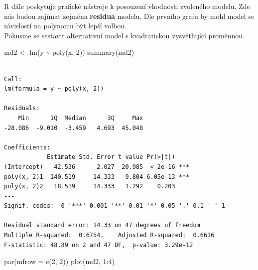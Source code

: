 \documentclass[
  letterpaper,
  DIV=11,
  numbers=noendperiod]{scrreprt}
\newenvironment{Shaded}{\begin{snugshade}}{\end{snugshade}}
\newcommand{\AttributeTok}[1]{\textcolor[rgb]{0.40,0.45,0.13}{#1}}
\newcommand{\DecValTok}[1]{\textcolor[rgb]{0.68,0.00,0.00}{#1}}
\newcommand{\FunctionTok}[1]{\textcolor[rgb]{0.28,0.35,0.67}{#1}}
\newcommand{\NormalTok}[1]{\textcolor[rgb]{0.00,0.23,0.31}{#1}}
\newcommand{\OtherTok}[1]{\textcolor[rgb]{0.00,0.23,0.31}{#1}}
\newcommand{\SpecialCharTok}[1]{\textcolor[rgb]{0.37,0.37,0.37}{#1}}
\begin{document}
R dále poskytuje grafické nástroje k posouzení vhodnosti zvoleného
modelu. Zde nás budou zajímat zejména \textbf{residua} modelu. Dle
prvního grafu by mohl model se závislostí na polynomu být lepší
volbou.\\

Pokusme se sestavit alternativní model s kvadratickou vysvětlující
proměnnou.

\begin{Shaded}
\begin{Highlighting}[]
\NormalTok{md2 }\OtherTok{\textless{}{-}} \FunctionTok{lm}\NormalTok{(y }\SpecialCharTok{\textasciitilde{}} \FunctionTok{poly}\NormalTok{(x, }\DecValTok{2}\NormalTok{))}
\FunctionTok{summary}\NormalTok{(md2)}
\end{Highlighting}
\end{Shaded}

\begin{verbatim}

Call:
lm(formula = y ~ poly(x, 2))

Residuals:
    Min      1Q  Median      3Q     Max 
-28.086  -9.010  -3.459   4.693  45.048 

Coefficients:
            Estimate Std. Error t value Pr(>|t|)    
(Intercept)   42.536      2.027  20.985  < 2e-16 ***
poly(x, 2)1  140.519     14.333   9.804 6.05e-13 ***
poly(x, 2)2   18.519     14.333   1.292    0.203    
---
Signif. codes:  0 '***' 0.001 '**' 0.01 '*' 0.05 '.' 0.1 ' ' 1

Residual standard error: 14.33 on 47 degrees of freedom
Multiple R-squared:  0.6754,    Adjusted R-squared:  0.6616 
F-statistic: 48.89 on 2 and 47 DF,  p-value: 3.29e-12
\end{verbatim}

\begin{Shaded}
\begin{Highlighting}[]
\FunctionTok{par}\NormalTok{(}\AttributeTok{mfrow =} \FunctionTok{c}\NormalTok{(}\DecValTok{2}\NormalTok{, }\DecValTok{2}\NormalTok{))}
\FunctionTok{plot}\NormalTok{(md2, }\DecValTok{1}\SpecialCharTok{:}\DecValTok{4}\NormalTok{)}
\end{Highlighting}
\end{Shaded}
\end{document}

